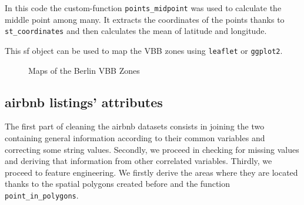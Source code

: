 

In this code the custom-function \texttt{points\_midpoint} was used to calculate the middle point among many. It extracts the coordinates of the points thanks to \texttt{st\_coordinates} and then calculates the mean of latitude and longitude.



This sf object can be used to map the VBB zones using \texttt{leaflet} or \texttt{ggplot2}.

\begin{figure}[H]
\centering
{}
\caption{Maps of the Berlin VBB Zones}
\centering
\end{figure}

\subsection{airbnb listings' attributes}

The first part of cleaning the airbnb datasets consists in joining the two containing general information according to their common variables and correcting some string values.
Secondly, we proceed in checking for missing values and deriving that information from other correlated variables.
Thirdly, we proceed to feature engineering.
We firstly derive the areas where they are located thanks to the spatial polygons created before and the function \texttt{point\_in\_polygons}.

